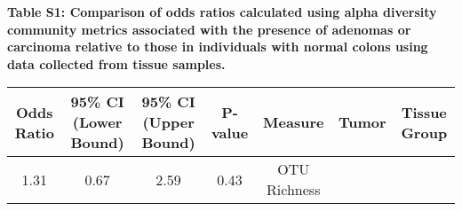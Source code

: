 \documentclass[12pt,]{article}
\title{}
\author{}
\date{}
\begin{document}

\textbf{Table S1: Comparison of odds ratios calculated using alpha
diversity community metrics associated with the presence of adenomas or
carcinoma relative to those in individuals with normal colons using data
collected from tissue samples.}

\footnotesize

\begin{longtable}[]{@{}ccccccc@{}}
\toprule
\begin{minipage}[b]{0.09\columnwidth}\centering\strut
Odds Ratio\strut
\end{minipage} & \begin{minipage}[b]{0.16\columnwidth}\centering\strut
95\% CI (Lower Bound)\strut
\end{minipage} & \begin{minipage}[b]{0.16\columnwidth}\centering\strut
95\% CI (Upper Bound)\strut
\end{minipage} & \begin{minipage}[b]{0.07\columnwidth}\centering\strut
P-value\strut
\end{minipage} & \begin{minipage}[b]{0.14\columnwidth}\centering\strut
Measure\strut
\end{minipage} & \begin{minipage}[b]{0.09\columnwidth}\centering\strut
Tumor\strut
\end{minipage} & \begin{minipage}[b]{0.11\columnwidth}\centering\strut
Tissue Group\strut
\end{minipage}\tabularnewline
\midrule
\endhead
\begin{minipage}[t]{0.09\columnwidth}\centering\strut
1.31\strut
\end{minipage} & \begin{minipage}[t]{0.16\columnwidth}\centering\strut
0.67\strut
\end{minipage} & \begin{minipage}[t]{0.16\columnwidth}\centering\strut
2.59\strut
\end{minipage} & \begin{minipage}[t]{0.07\columnwidth}\centering\strut
0.43\strut
\end{minipage} & \begin{minipage}[t]{0.14\columnwidth}\centering\strut
OTU Richness\strut
\end{minipage} & \begin{minipage}[t]{0.09\columnwidth}\centering\strut

\end{minipage}
\end{longtable}
\end{document}
